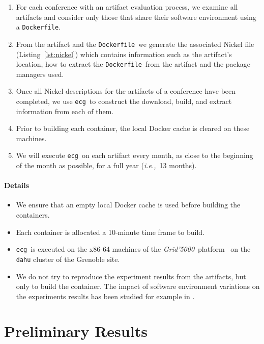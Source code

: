 \documentclass[sigconf,natbib=false]{acmart}
\newcommand{\ie}{\emph{i.e.,}}
\newcommand{\grid}{\emph{Grid'5000}}
\newcommand{\df}{\texttt{Dockerfile}}
\newcommand{\ecg}{\texttt{ecg}}
\begin{document}
\begin{enumerate}
\item For each conference with an artifact evaluation process, we examine all artifacts and consider only those that share their software environment using a \df.
\item From the artifact and the \df\ we generate the associated Nickel file (Listing~\ref{lst:nickel}) which contains information such as the artifact's location, how to extract the \df\ from the artifact and the package managers used. 
\item Once all Nickel descriptions for the artifacts of a conference have been completed, we use \ecg\ to construct the download, build, and extract information from each of them.
\item Prior to building each container, the local Docker cache is cleared on these machines.
\item We will execute \ecg\ on each artifact every month, as close to the beginning of the month as possible, for a full year (\ie\ 13 months).
\end{enumerate}

\paragraph{Details}
\begin{itemize}
\item We ensure that an empty local Docker cache is used before building the containers.
\item Each container is allocated a 10-minute time frame to build.
\item \ecg\ is executed on the x86-64 machines of the \grid\ platform~\cite{grid5000} on the \texttt{dahu} cluster of the Grenoble site.
\item We do not try to reproduce the experiment results from the artifacts, but only to build the container. The impact of software environment variations on the experiments results has been studied for example in \cite{mytkowicz_producing_nodate, sokolowski2024impact}.
\end{itemize}

\section{Preliminary Results}\label{sec:results}
\end{document}
